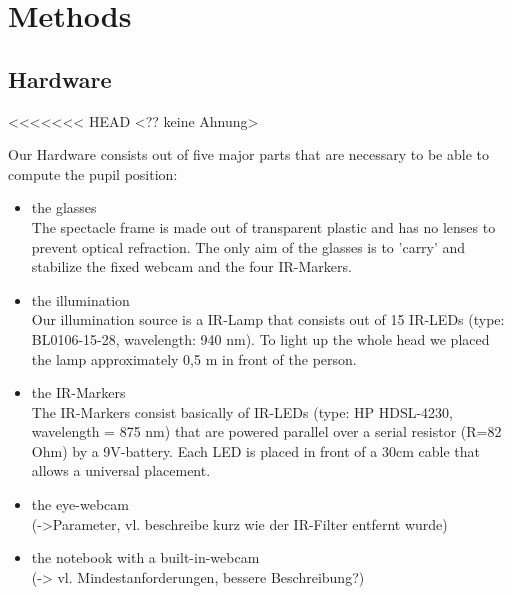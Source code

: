 \section{Methods}\label{methods}

\subsection{Hardware}
<<<<<<< HEAD <?? keine Ahnung>

Our Hardware consists out of five major parts that are necessary to be able to compute the pupil position:

\begin{itemize}
  \item the glasses\\
  The spectacle frame is made out of transparent plastic and has no lenses to prevent optical refraction. The only aim of the glasses is to 'carry' and stabilize the fixed webcam and the four IR-Markers.

  \item the illumination\\
Our illumination source is a IR-Lamp that consists out of 15 IR-LEDs (type: BL0106-15-28, wavelength: 940 nm). To light up the whole head we placed the lamp approximately 0,5 m in front of the person.

  \item the IR-Markers\\
The IR-Markers consist basically of IR-LEDs (type: HP HDSL-4230, wavelength = 875 nm) that are powered parallel over a serial resistor (R=82 Ohm) by a 9V-battery. Each LED is placed in front of a 30cm cable that allows a universal placement. 

  \item the eye-webcam\\ 
(->Parameter, vl. beschreibe kurz wie der IR-Filter entfernt wurde)

  \item the notebook with a built-in-webcam\\
(-> vl. Mindestanforderungen, bessere Beschreibung?)


\end{itemize}
